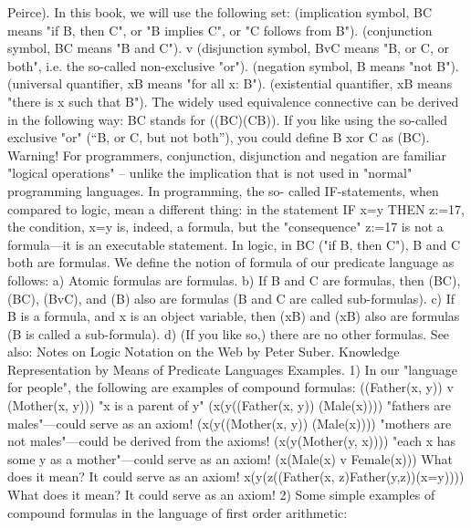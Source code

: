 Peirce). In this book, we will use the following set:
\IMPLIES  (implication symbol, B\IMPLIES C means "if B, then C", or "B implies C", or "C follows from B").
\AND  (conjunction symbol, B\AND C means "B and C").
v (disjunction symbol, BvC means "B, or C, or both", i.e. the so-called non-exclusive "or").
\neg  (negation symbol, \neg B means "not B").
\forall  (universal quantifier, \forall xB means "for all x: B").
\exists  (existential quantifier, \exists xB means "there is x such that B").
The widely used equivalence connective \IFF  can be derived in the following way: B\IFF C stands for
((B\IMPLIES C)\AND (C\IMPLIES B)). If you like using the so-called exclusive "or" (``B, or C, but not both''), you could
define B xor C as \neg (B\IFF C).
Warning! For programmers, conjunction, disjunction and negation are familiar "logical operations" –
unlike the implication that is not used in "normal" programming languages. In programming, the so-
called IF-statements, when compared to logic, mean a different thing: in the statement IF x=y THEN
z:=17, the condition, x=y is, indeed, a formula, but the "consequence" z:=17 is not a formula---it is an
executable statement. In logic, in B\IMPLIES C ("if B, then C"), B and C both are formulas.
We define the notion of formula of our predicate language as follows:
a) Atomic formulas are formulas.
b) If B and C are formulas, then (B\IMPLIES C), (B\AND C), (BvC), and (\neg B) also are formulas (B and C are called
sub-formulas).
c) If B is a formula, and x is an object variable, then (\forall xB) and (\exists xB) also are formulas (B is called a
sub-formula).
d) (If you like so,) there are no other formulas.
See also:
Notes on Logic Notation on the Web by Peter Suber.
Knowledge Representation by Means of Predicate Languages
Examples. 1) In our "language for people", the following are examples of compound formulas:
((Father(x, y)) v (Mother(x, y))) "x is a parent of y"
(\forall x(\forall y((Father(x, y)) \IMPLIES  (Male(x)))) "fathers are males"---could serve as an axiom!
(\forall x(\forall y((Mother(x, y)) \IMPLIES  (\neg Male(x)))) "mothers are not males"---could be derived from
                                             the axioms!
(\forall x(\exists y(Mother(y, x)))) "each x has some y as a mother"---could serve as
                            an axiom!
(\forall x(Male(x) v Female(x))) What does it mean? It could serve as an axiom!
\forall x(\forall y(\forall z((Father(x, z)\AND Father(y,z))\IMPLIES (x=y)))) What does it mean? It could serve as an axiom!
2) Some simple examples of compound formulas in the language of first order arithmetic:

